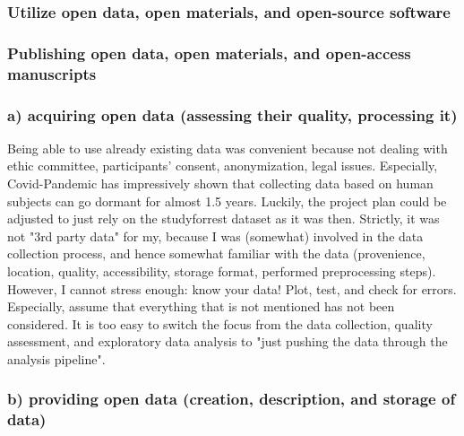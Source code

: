 

\subsubsection{Utilize open data, open materials, and open-source software}




\subsubsection{Publishing open data, open materials, and open-access
manuscripts}







\subsubsection{a) acquiring open data (assessing their quality, processing it)}

%
Being able to use already existing data was convenient because not dealing with
ethic committee, participants' consent, anonymization, legal issues.
%
Especially, Covid-Pandemic has impressively shown that collecting data based on
human subjects can go dormant for almost 1.5 years.
%
Luckily, the project plan could be adjusted to just rely on the studyforrest
dataset as it was then.
%
Strictly, it was not "3rd party data" for my, because I was (somewhat) involved
in the data collection process, and hence somewhat familiar with the data
(provenience, location, quality, accessibility, storage format, performed
preprocessing steps).
%
However, I cannot stress enough: know your data! Plot, test, and check for
errors.
%
Especially, assume that everything that is not mentioned has not been
considered.
%
It is too easy to switch the focus from the data collection, quality assessment,
and exploratory data analysis to "just pushing the data through the analysis
pipeline".



\subsubsection{b) providing open data (creation, description, and storage of
data)}




